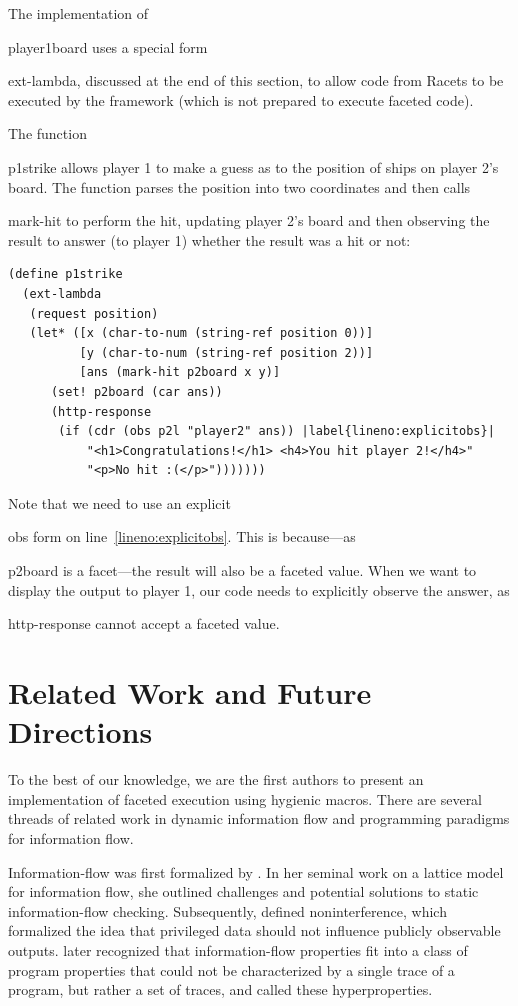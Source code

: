 \documentclass[review=true,acmlarge]{acmart}
\newcommand*{\SavedLstInline}{}
\DeclareRobustCommand*{\lstinline}{%
  \ifmmode
    \let\SavedBGroup\bgroup
    \def\bgroup{%
      \let\bgroup\SavedBGroup
      \hbox\bgroup
    }%
  \fi
  \SavedLstInline
}
\newcommand{\code}[1]{\lstinline{#1}}
\begin{document}
The implementation of \code{player1board} uses a special form
\code{ext-lambda}, discussed at the end of this section, to allow code
from Racets to be executed by the framework (which is not prepared to
execute faceted code).

The function \code{p1strike} allows player 1 to make a guess as to the
position of ships on player 2's board. The function parses the
position into two coordinates and then calls \code{mark-hit} to
perform the hit, updating player 2's board and then observing the
result to answer (to player 1) whether the result was a hit or not:

\begin{lstlisting}[language=Racket,escapechar=|,name=case]
(define p1strike
  (ext-lambda
   (request position)
   (let* ([x (char-to-num (string-ref position 0))]
          [y (char-to-num (string-ref position 2))]
          [ans (mark-hit p2board x y)]
      (set! p2board (car ans))
      (http-response
       (if (cdr (obs p2l "player2" ans)) |label{lineno:explicitobs}|
           "<h1>Congratulations!</h1> <h4>You hit player 2!</h4>"
           "<p>No hit :(</p>")))))))
\end{lstlisting}

Note that we need to use an explicit \code{obs} form on
line~\ref{lineno:explicitobs}. This is because---as \code{p2board} is
a facet---the result will also be a faceted value. When we want to
display the output to player 1, our code needs to explicitly observe
the answer, as \code{http-response} cannot accept a faceted value.

\paragraph*{}

\section{Related Work and Future Directions}

To the best of our knowledge, we are the first authors to present an
implementation of faceted execution using hygienic macros. There are
several threads of related work in dynamic information flow and
programming paradigms for information flow.

Information-flow was first formalized by \citet{Denning:1976}.
In her seminal work on a lattice model
for information flow, she outlined challenges and potential solutions
to static information-flow checking. Subsequently, \citet{Goguen:82}
defined noninterference, which formalized the idea that privileged
data should not influence publicly observable
outputs. \citet{Clarkson:08} later recognized that
information-flow properties fit into a class of program properties
that could not be characterized by a single trace of a program, but
rather a set of traces, and called these hyperproperties.
\end{document}
